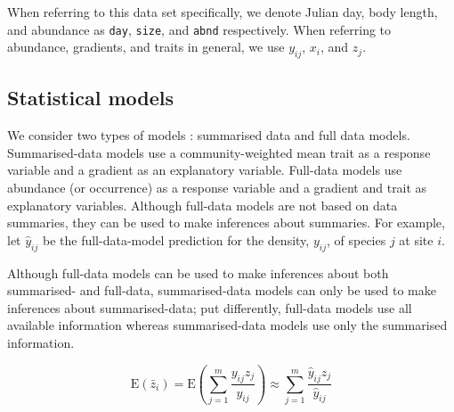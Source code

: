 \documentclass[12pt]{ecology}
\begin{document}
When referring to this data set specifically, we denote Julian day, body length, and abundance as \texttt{day}, \texttt{size}, and \texttt{abnd} respectively.  When referring to abundance, gradients, and traits in general, we use $y_{ij}$, $x_i$, and $z_j$.


\subsection{Statistical models}

We consider two types of models : summarised data and full data models.  Summarised-data models use a community-weighted mean trait as a response variable and a gradient as an explanatory variable.  Full-data models use abundance (or occurrence) as a response variable and a gradient and trait as explanatory variables.  Although full-data models are not based on data summaries, they can be used to make inferences about summaries.  For example, let $\hat{y}_{ij}$ be the full-data-model prediction for the density, $y_{ij}$, of species $j$ at site $i$.  


  Although full-data models can be used to make inferences about both summarised- and full-data, summarised-data models can only be used to make inferences about summarised-data; put differently, full-data models use all available information whereas summarised-data models use only the summarised information.  

\begin{equation}
\mathrm{E}(\bar{z}_i) = \mathrm{E}\left( \sum_{j=1}^m \frac{y_{ij} z_j}{y_{ij}} \right) \approx \sum_{j=1}^m \frac{\hat{y}_{ij} z_j}{\hat{y}_{ij}}
\end{equation}
\end{document}
